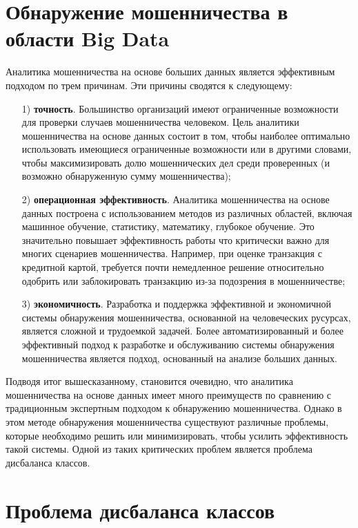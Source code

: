 \documentclass[12pt]{report}
\begin{document}
	\section{Обнаружение мошенничества в области Big Data}
	
	Аналитика мошенничества на основе больших данных является эффективным подходом по трем причинам. Эти причины сводятся к следующему:
	\begin{enumerate}
		\item[1)] \textbf{точность}. Большинство организаций имеют ограниченные возможности для проверки случаев мошенничества человеком. Цель аналитики мошенничества на основе данных состоит в том, чтобы наиболее оптимально использовать имеющиеся ограниченные возможности или в другими словами, чтобы максимизировать долю мошеннических дел среди проверенных (и возможно обнаруженную сумму мошенничества);
		\item[2)] \textbf{операционная эффективность}. Аналитика мошенничества на основе данных построена с использованием методов из различных областей, включая машинное обучение, статистику, математику, глубокое обучение. Это значительно повышает эффективность работы что критически важно для многих сценариев мошенничества. Например, при оценке транзакция с кредитной картой, требуется почти немедленное решение относительно одобрить или заблокировать транзакцию из-за подозрения в мошенничестве;
		\item[3)] \textbf{экономичность}. Разработка и поддержка эффективной и экономичной системы обнаружения мошенничества, основанной на человеческих русурсах, является сложной и трудоемкой задачей. Более автоматизированный и более эффективный подход к разработке и обслуживанию системы обнаружения мошенничества является подход, основанный на анализе больших данных.
	\end{enumerate}
	
	Подводя итог вышесказанному, становится очевидно, что аналитика мошенничества на основе данных имеет много преимуществ по сравнению с традиционным экспертным подходом к обнаружению мошенничества. Однако в этом методе обнаружения мошенничества существуют различные проблемы, которые необходимо решить или минимизировать, чтобы усилить эффективность такой системы. Одной из таких критических проблем является проблема дисбаланса классов.
	
	\section{Проблема дисбаланса классов}
	
\end{document}
